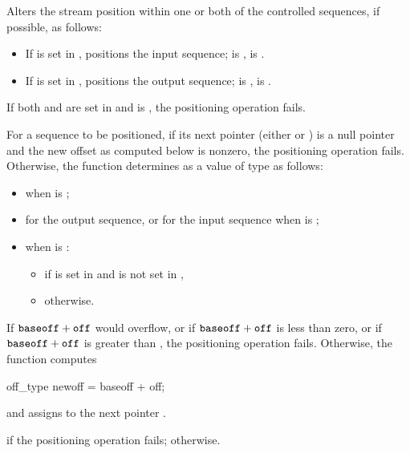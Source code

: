 \begin{itemdescr}
\pnum
\effects
Alters the stream position within one or both of the
controlled sequences, if possible, as follows:
\begin{itemize}
\item
If  is set in , positions the input sequence;
 is ,  is .
\item
If  is set in , positions the output sequence;
 is ,  is .
\end{itemize}

\pnum
If both  and  are set in 
and  is ,
the positioning operation fails.

\pnum
For a sequence to be positioned,
if its next pointer  (either  or )
is a null pointer and
the new offset  as computed below is nonzero,
the positioning operation fails.
Otherwise, the function determines 
as a value of type  as follows:
\begin{itemize}
\item
{} when  is ;
\item
{} for the output sequence, or
 for the input sequence
when  is ;
\item
when  is  :
\begin{itemize}
\item
{}
if  is set in  and
 is not set in ,
\item
{} otherwise.
\end{itemize}
\end{itemize}

\pnum
If $\texttt{baseoff} + \texttt{off}$ would overflow, or
if $\texttt{baseoff} + \texttt{off}$ is less than zero, or
if $\texttt{baseoff} + \texttt{off}$ is greater than ,
the positioning operation fails.
Otherwise, the function computes
\begin{codeblock}
off_type newoff = baseoff + off;
\end{codeblock}
and assigns  to the next pointer .

\pnum
\returns
{} if the positioning operation fails;
 otherwise.
\end{itemdescr}

